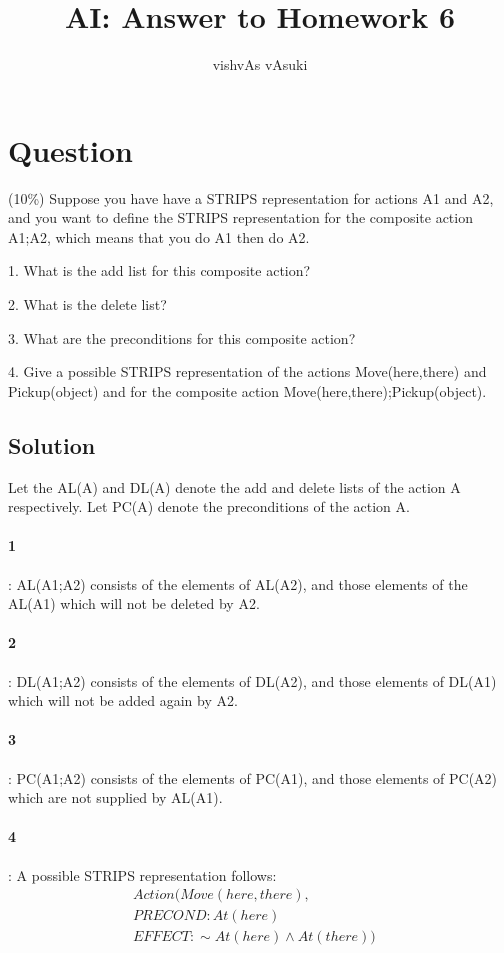 \documentclass[10pt]{article}
\title{AI: Answer to Homework 6}
\author{vishvAs vAsuki}
\begin{document}
\maketitle

\section{Question} 

(10\%) Suppose you have have a STRIPS representation for actions A1 and A2, and you want to define the STRIPS representation for the composite action A1;A2, which means that you do A1 then do A2.

1. What is the add list for this composite action?

2. What is the delete list?

3. What are the preconditions for this composite action?

4. Give a possible STRIPS representation of the actions Move(here,there) and Pickup(object) and for the composite action Move(here,there);Pickup(object).

\subsection{Solution}

Let the AL(A) and DL(A) denote the add and delete lists of the action A respectively. Let PC(A) denote the preconditions of the action A.

\paragraph{1}: AL(A1;A2) consists of the elements of AL(A2), and those elements of the AL(A1) which will not be deleted by A2.

\paragraph{2}: DL(A1;A2) consists of the elements of DL(A2), and those elements of DL(A1) which will not be added again by A2.

\paragraph{3}: PC(A1;A2) consists of the elements of PC(A1), and those elements of PC(A2) which are not supplied by AL(A1).

\paragraph{4}: A possible STRIPS representation follows:
\begin{eqnarray}
Action( Move(here,there), &\\
PRECOND: At(here) &\\
EFFECT: \sim At(here) \wedge At(there) )&\\
\end{eqnarray}
\end{document}
